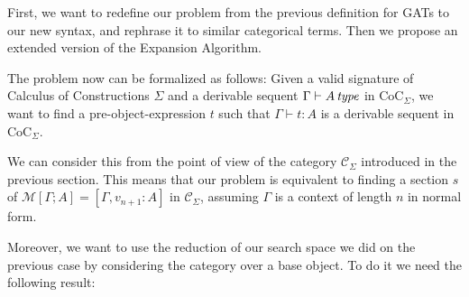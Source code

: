 First, we want to redefine our problem from the previous definition for GATs to our new syntax, and rephrase it to 
similar categorical terms. Then we propose an extended version of the Expansion Algorithm.

The problem now can be formalized as follows:
Given a valid signature of Calculus of Constructions $\Sigma$ and a derivable sequent $\Gamma \vdash A \operatorname{\mathit{\space type}}$ in 
$\text{CoC}_\Sigma$, we want to find a pre-object-expression $t$ such that 
$\Gamma \vdash t \colon A$ is a derivable sequent in $\text{CoC}_\Sigma$.

We can consider this from the point of view of the category $\mathcal{C}_\Sigma$ introduced in the previous section.
This means that our problem is equivalent to finding a section $s$ of 
$\mathcal{M}[\Gamma; A] = [\Gamma, v_{n+1} \colon A]$ in $\mathcal{C}_\Sigma$, assuming
$\Gamma$ is a context of length $n$ in normal form.

Moreover, we want to use the reduction of our search space we did on the previous case
by considering the category over a base object. To do it we need the following result:

